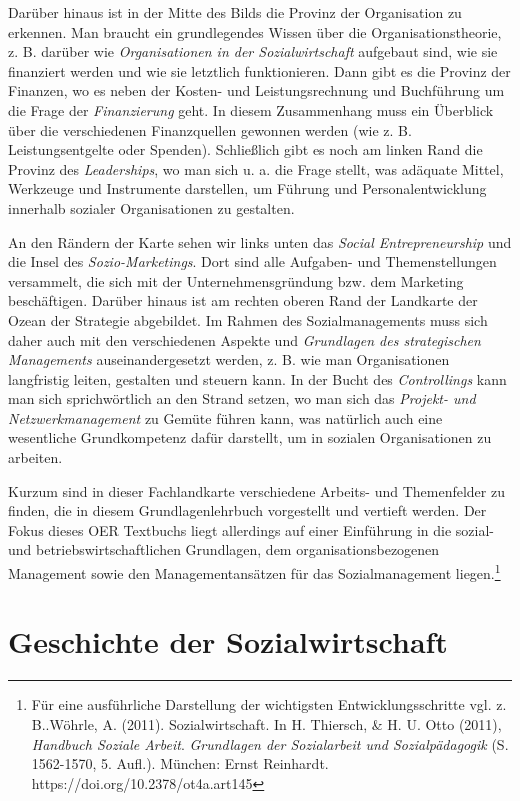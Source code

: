 \documentclass[
  letterpaper,
]{book}
\begin{document}
Darüber hinaus ist in der Mitte des Bilds die Provinz der Organisation
zu erkennen. Man braucht ein grundlegendes Wissen über die
Organisationstheorie, z. B. darüber wie \emph{Organisationen in der
Sozialwirtschaft} aufgebaut sind, wie sie finanziert werden und wie sie
letztlich funktionieren. Dann gibt es die Provinz der Finanzen, wo es
neben der Kosten- und Leistungsrechnung und Buchführung um die Frage der
\emph{Finanzierung} geht. In diesem Zusammenhang muss ein Überblick über
die verschiedenen Finanzquellen gewonnen werden (wie z. B.
Leistungsentgelte oder Spenden). Schließlich gibt es noch am linken Rand
die Provinz des \emph{Leaderships}, wo man sich u. a. die Frage stellt,
was adäquate Mittel, Werkzeuge und Instrumente darstellen, um Führung
und Personalentwicklung innerhalb sozialer Organisationen zu gestalten.

An den Rändern der Karte sehen wir links unten das \emph{Social
Entrepreneurship} und die Insel des \emph{Sozio-Marketings}. Dort sind
alle Aufgaben- und Themenstellungen versammelt, die sich mit der
Unternehmensgründung bzw. dem Marketing beschäftigen. Darüber hinaus ist
am rechten oberen Rand der Landkarte der Ozean der Strategie abgebildet.
Im Rahmen des Sozialmanagements muss sich daher auch mit den
verschiedenen Aspekte und \emph{Grundlagen des strategischen
Managements} auseinandergesetzt werden, z. B. wie man Organisationen
langfristig leiten, gestalten und steuern kann. In der Bucht des
\emph{Controllings} kann man sich sprichwörtlich an den Strand setzen,
wo man sich das \emph{Projekt- und Netzwerkmanagement} zu Gemüte führen
kann, was natürlich auch eine wesentliche Grundkompetenz dafür
darstellt, um in sozialen Organisationen zu arbeiten.

Kurzum sind in dieser Fachlandkarte verschiedene Arbeits- und
Themenfelder zu finden, die in diesem Grundlagenlehrbuch vorgestellt und
vertieft werden. Der Fokus dieses OER Textbuchs liegt allerdings auf
einer Einführung in die sozial- und betriebswirtschaftlichen Grundlagen,
dem organisationsbezogenen Management sowie den Managementansätzen für
das Sozialmanagement liegen.\footnote{Für eine ausführliche Darstellung
  der wichtigsten Entwicklungsschritte vgl. z. B..Wöhrle, A. (2011).
  Sozialwirtschaft. In H. Thiersch, \& H. U. Otto (2011), \emph{Handbuch
  Soziale Arbeit}. \emph{Grundlagen der Sozialarbeit und
  Sozialpädagogik} (S. 1562-1570, 5. Aufl.). München: Ernst Reinhardt.
  https://doi.org/10.2378/ot4a.art145}

\section{Geschichte der Sozialwirtschaft}\label{geschichte}
\end{document}
